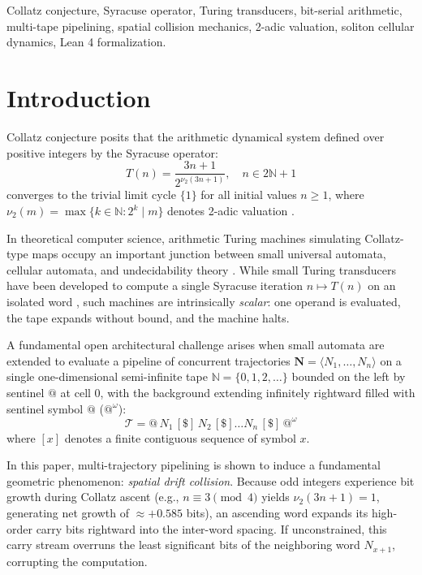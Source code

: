 \documentclass[journal,10pt,twocolumn]{IEEEtran}
\begin{document}
\begin{IEEEkeywords}
Collatz conjecture, Syracuse operator, Turing transducers, bit-serial arithmetic, multi-tape pipelining, spatial collision mechanics, 2-adic valuation, soliton cellular dynamics, Lean 4 formalization.
\end{IEEEkeywords}

\section{Introduction}
 Collatz conjecture posits that the arithmetic dynamical system defined over positive integers by the Syracuse operator:
\begin{equation}
T(n) = \frac{3n+1}{2^{\nu_2(3n+1)}}, \quad n \in 2\mathbb{N}+1
\label{eq:syracuse_def}
\end{equation}
converges to the trivial limit cycle $\{1\}$ for all initial values $n \ge 1$, where $\nu_2(m) = \max \{ k \in \mathbb{N} : 2^k \mid m \}$ denotes 2-adic valuation \cite{lagarias1985,terras1976}. 

In theoretical computer science, arithmetic Turing machines simulating Collatz-type maps occupy an important junction between small universal automata, cellular automata, and undecidability theory \cite{conway1972,margenstern2000,woods2009,baiocchi2001}. While small Turing transducers have been developed to compute a single Syracuse iteration $n \mapsto T(n)$ on an isolated word \cite{michel2010}, such machines are intrinsically \textit{scalar}: one operand is evaluated, the tape expands without bound, and the machine halts.

A fundamental open architectural challenge arises when small automata are extended to evaluate a pipeline of concurrent trajectories $\mathbf{N} = \langle N_1, \dots, N_n \rangle$ on a single one-dimensional semi-infinite tape $\mathbb{N} = \{0, 1, 2, \dots\}$ bounded on the left by sentinel $@$ at cell 0, with the background extending infinitely rightward filled with sentinel symbol $@$ ($@^\omega$):
\begin{equation}
\mathcal{T} = @ \, N_1 \, [\$] \, N_2 \, [\$] \dots N_n \, [\$] \, @^\omega
\label{eq:tape_arch}
\end{equation}
where $[x]$ denotes a finite contiguous sequence of symbol $x$.

In this paper, multi-trajectory pipelining is shown to induce a fundamental geometric phenomenon: \textit{spatial drift collision}. Because odd integers experience bit growth during Collatz ascent (e.g., $n \equiv 3 \pmod 4$ yields $\nu_2(3n+1) = 1$, generating net growth of $\approx +0.585$ bits), an ascending word expands its high-order carry bits rightward into the inter-word spacing. If unconstrained, this carry stream overruns the least significant bits of the neighboring word $N_{x+1}$, corrupting the computation.
\end{document}
